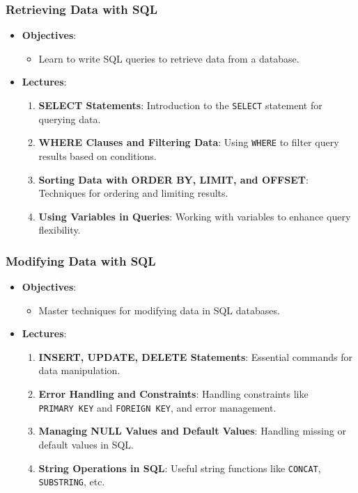 \documentclass[
  letterpaper,
  DIV=11,
  numbers=noendperiod]{scrartcl}
\providecommand{\tightlist}{%
  \setlength{\itemsep}{0pt}\setlength{\parskip}{0pt}}\usepackage{longtable,booktabs,array}
\begin{document}
\subsubsection{Retrieving Data with SQL}\label{retrieving-data-with-sql}

\begin{itemize}
\tightlist
\item
  \textbf{Objectives}:

  \begin{itemize}
  \tightlist
  \item
    Learn to write SQL queries to retrieve data from a database.
  \end{itemize}
\item
  \textbf{Lectures}:

  \begin{enumerate}
  \def\labelenumi{\arabic{enumi}.}
  \tightlist
  \item
    \textbf{SELECT Statements}: Introduction to the \texttt{SELECT}
    statement for querying data.
  \item
    \textbf{WHERE Clauses and Filtering Data}: Using \texttt{WHERE} to
    filter query results based on conditions.
  \item
    \textbf{Sorting Data with ORDER BY, LIMIT, and OFFSET}: Techniques
    for ordering and limiting results.
  \item
    \textbf{Using Variables in Queries}: Working with variables to
    enhance query flexibility.
  \end{enumerate}
\end{itemize}

\subsubsection{Modifying Data with SQL}\label{modifying-data-with-sql}

\begin{itemize}
\tightlist
\item
  \textbf{Objectives}:

  \begin{itemize}
  \tightlist
  \item
    Master techniques for modifying data in SQL databases.
  \end{itemize}
\item
  \textbf{Lectures}:

  \begin{enumerate}
  \def\labelenumi{\arabic{enumi}.}
  \tightlist
  \item
    \textbf{INSERT, UPDATE, DELETE Statements}: Essential commands for
    data manipulation.
  \item
    \textbf{Error Handling and Constraints}: Handling constraints like
    \texttt{PRIMARY\ KEY} and \texttt{FOREIGN\ KEY}, and error
    management.
  \item
    \textbf{Managing NULL Values and Default Values}: Handling missing
    or default values in SQL.
  \item
    \textbf{String Operations in SQL}: Useful string functions like
    \texttt{CONCAT}, \texttt{SUBSTRING}, etc.
  \end{enumerate}
\end{itemize}
\end{document}
